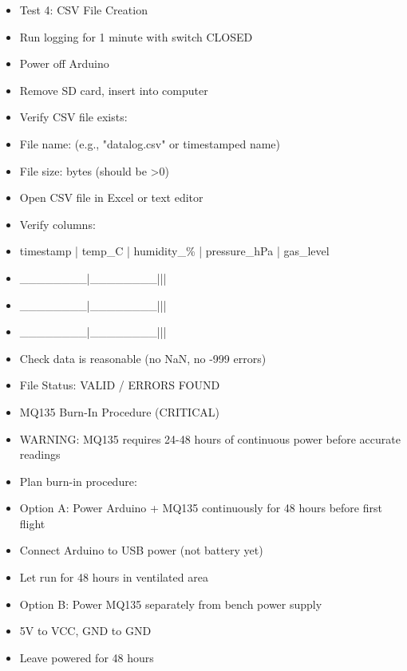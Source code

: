 \documentclass[11pt,letterpaper]{article}
\begin{document}
\begin{itemize}
  \item Test 4: CSV File Creation
  \item Run logging for 1 minute with switch CLOSED
  \item Power off Arduino
  \item Remove SD card, insert into computer
  \item Verify CSV file exists:
  \item File name: \underline{\hspace{1.5cm}} (e.g., "datalog.csv" or timestamped name)
  \item File size: \underline{\hspace{1.5cm}} bytes (should be >0)
  \item Open CSV file in Excel or text editor
  \item Verify columns:
  \item timestamp | temp\_C | humidity\_\% | pressure\_hPa | gas\_level
  \item \_\_\_\_\_\_\_\_|\_\_\_\_\_\_\_\_|\underline{\hspace{1.7999999999999998cm}}|\underline{\hspace{2.1cm}}|\underline{\hspace{1.5cm}}
  \item \_\_\_\_\_\_\_\_|\_\_\_\_\_\_\_\_|\underline{\hspace{1.7999999999999998cm}}|\underline{\hspace{2.1cm}}|\underline{\hspace{1.5cm}}
  \item \_\_\_\_\_\_\_\_|\_\_\_\_\_\_\_\_|\underline{\hspace{1.7999999999999998cm}}|\underline{\hspace{2.1cm}}|\underline{\hspace{1.5cm}}
  \item Check data is reasonable (no NaN, no -999 errors)
  \item File Status: VALID / ERRORS FOUND
\end{itemize}

\begin{itemize}
  \item MQ135 Burn-In Procedure (CRITICAL)
  \item [WARNING] WARNING: MQ135 requires 24-48 hours of continuous power before accurate readings
\end{itemize}

\begin{itemize}
  \item Plan burn-in procedure:
  \item Option A: Power Arduino + MQ135 continuously for 48 hours before first flight
  \item Connect Arduino to USB power (not battery yet)
  \item Let run for 48 hours in ventilated area
  \item Option B: Power MQ135 separately from bench power supply
  \item 5V to VCC, GND to GND
  \item Leave powered for 48 hours
\end{itemize}
\end{document}
